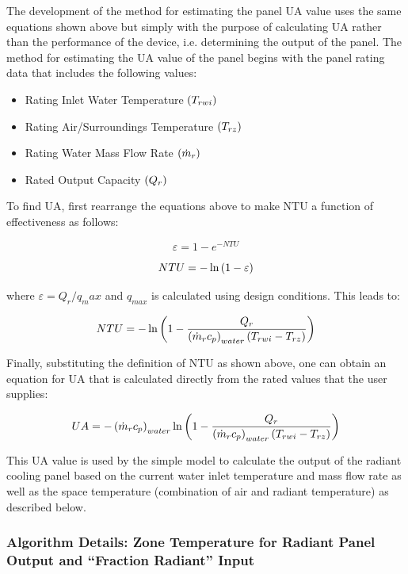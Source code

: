 {The development of the method for estimating the panel UA value uses the same equations shown above but simply with the purpose of calculating UA rather than the performance of the device, i.e. determining the output of the panel.  The method for estimating the UA value of the panel begins with the panel rating data that includes the following values:

\begin{itemize}
\tightlist
\item
  Rating Inlet Water Temperature $\PB{T_{rwi}}$
\item
  Rating Air/Surroundings Temperature $\PB{T_{rz}}$
\item
  Rating Water Mass Flow Rate $\PB{\dot{m}_r}$
\item
  Rated Output Capacity $\PB{Q_r}$
\end{itemize}

To find UA, first rearrange the equations above to make NTU a function of effectiveness as follows:

\begin{equation}
\varepsilon = 1 - e^{-NTU}
\end{equation}

\begin{equation}
NTU = -\ln{\PB{1-\varepsilon}}
\end{equation}

where $\varepsilon = {Q_r}/{q_max}$ and \(q_{max}\) is calculated using design conditions.  This leads to:

\begin{equation}
NTU = -\ln{\PB{1-\frac{Q_r}{\PB{\dot{m}_r c_p}_{water}\PB{T_{rwi}-T_{rz}}}}}
\end{equation}

Finally, substituting the definition of NTU as shown above, one can obtain an equation for UA that is calculated directly from the rated values that the user supplies:

\begin{equation}
UA = -\PB{\dot{m}_r c_p}_{water} \ln{\PB{1-\frac{Q_r}{\PB{\dot{m}_r c_p}_{water}\PB{T_{rwi}-T_{rz}}}}}
\end{equation}

This UA value is used by the simple model to calculate the output of the radiant cooling panel based on the current water inlet temperature and mass flow rate as well as the space temperature (combination of air and radiant temperature) as described below.

\subsubsection{Algorithm Details: Zone Temperature for Radiant Panel Output and “Fraction Radiant” Input}\label{algoithm-details-zone-temperature-for-radiant-panel-and-fraction-radiant-input}

}
